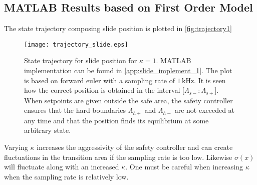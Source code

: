 \subsection{MATLAB Results based on First Order Model}\label{subsec:matlab-results-1order}
The state trajectory composing slide position is plotted in \autoref{fig:trajectory1}
\begin{figure}[H]
	\center
		\texttt{[image: trajectory\_slide.eps]}
	\caption{State trajectory for slide position for $\kappa=1$. MATLAB implementation can be found in \autoref{app:slide_implement_1}. The plot is based on forward euler with a sampling rate of $1\,$kHz. It is seen how the correct position is obtained in the interval $[\Lambda_{s-}:\Lambda_{s+}$]. When setpoints are given outside the safe area, the safety controller ensures that the hard boundaries $\Lambda_{h+}$ and $\Lambda_{h-}$ are not exceeded at any time and that the position finds its equilibrium at some arbitrary state.}
	\label{fig:trajectory1}
\end{figure}
Varying $\kappa$ increases the aggressivity of the safety controller and can create fluctuations in the transition area if the sampling rate is too low. Likewise $\sigma(x)$ will fluctuate along with an increased $\kappa$. One must be careful when increasing $\kappa$ when the sampling rate is relatively low. %

